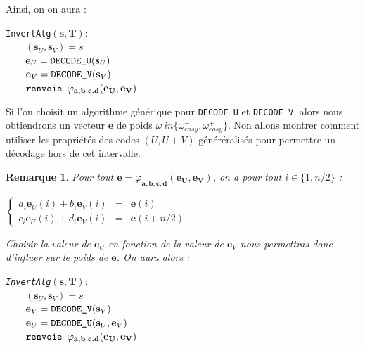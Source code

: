 \documentclass[12pt]{article}
\theoremstyle{plain}
\newtheorem{remarque}[thm]{Remarque}
\begin{document}
\noindent Ainsi, on on aura : \\
\begin{flushleft}
\leftskip=2cm
\verb|InvertAlg|$(\mathbf{s},\mathbf{T}) : $\\
$\qquad (\mathbf{s}_U, \mathbf{s}_V) = s $\\
$\qquad \mathbf{e}_U = \verb|DECODE_U|(\mathbf{s}_U) $\\
$\qquad \mathbf{e}_V = \verb|DECODE_V|(\mathbf{s}_V)$ \\
$\qquad \verb|renvoie | \varphi_{\mathbf{a},\mathbf{b},\mathbf{c},\mathbf{d}}(\mathbf{e_U},\mathbf{e_V})$ \\
\leftskip=0cm
\vspace{0.1in}

\end{flushleft}
Si l'on choisit un algorithme générique pour \verb|DECODE_U| et \verb|DECODE_V|, alors nous obtiendrons un vecteur $\mathbf{e}$ de poids $\omega \ in \{\omega_{easy}^-,\omega_{easy}^+\}$. Non allons montrer comment utiliser les propriétés des codes $(U,U+V)$-généréralisés pour permettre un décodage hors de cet intervalle. 

\begin{remarque} Pour tout $\mathbf{e} = \varphi_{\mathbf{a},\mathbf{b},\mathbf{c},\mathbf{d}}(\mathbf{e_U},\mathbf{e_V})$, on a pour tout $i \in \{1,n/2\}$ :
\begin{center}

$\left \{
\begin{array}{rcl}
a_i\mathbf{e}_U(i) + b_i\mathbf{e}_V(i) &=& \mathbf{e}(i) \\
c_i\mathbf{e}_U(i) + d_i\mathbf{e}_V(i) &=& \mathbf{e}(i+n/2) 
\end{array}
\right.$
\end{center}

\noindent Choisir la valeur de $\mathbf{e}_U$ en fonction de la valeur de $\mathbf{e}_V$ nous permettras donc d'influer sur le poids de $\mathbf{e}$. On aura alors :

\begin{flushleft}
\leftskip=2cm
\verb|InvertAlg|$(\mathbf{s},\mathbf{T}) : $\\
$\qquad (\mathbf{s}_U, \mathbf{s}_V) = s $\\
$\qquad \mathbf{e}_V = \verb|DECODE_V|(\mathbf{s}_V)$ \\
$\qquad \mathbf{e}_U = \verb|DECODE_U|(\mathbf{s}_U, \mathbf{e}_V) $\\
$\qquad \verb|renvoie | \varphi_{\mathbf{a},\mathbf{b},\mathbf{c},\mathbf{d}}(\mathbf{e_U},\mathbf{e_V})$ \\
\leftskip=0cm
\vspace{0.1in}
\end{flushleft}

\end{remarque}
\end{document}
